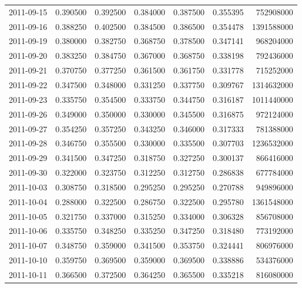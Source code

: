 \begin{tabular}{lrrrrrr}
2011-09-15 &    0.390500 &    0.392500 &    0.384000 &    0.387500 &    0.355395 &   752908000 \\
2011-09-16 &    0.388250 &    0.402500 &    0.384500 &    0.386500 &    0.354478 &  1391588000 \\
2011-09-19 &    0.380000 &    0.382750 &    0.368750 &    0.378500 &    0.347141 &   968204000 \\
2011-09-20 &    0.383250 &    0.384750 &    0.367000 &    0.368750 &    0.338198 &   792436000 \\
2011-09-21 &    0.370750 &    0.377250 &    0.361500 &    0.361750 &    0.331778 &   715252000 \\
2011-09-22 &    0.347500 &    0.348000 &    0.331250 &    0.337750 &    0.309767 &  1314632000 \\
2011-09-23 &    0.335750 &    0.354500 &    0.333750 &    0.344750 &    0.316187 &  1011440000 \\
2011-09-26 &    0.349000 &    0.350000 &    0.330000 &    0.345500 &    0.316875 &   972124000 \\
2011-09-27 &    0.354250 &    0.357250 &    0.343250 &    0.346000 &    0.317333 &   781388000 \\
2011-09-28 &    0.346750 &    0.355500 &    0.330000 &    0.335500 &    0.307703 &  1236532000 \\
2011-09-29 &    0.341500 &    0.347250 &    0.318750 &    0.327250 &    0.300137 &   866416000 \\
2011-09-30 &    0.322000 &    0.323750 &    0.312250 &    0.312750 &    0.286838 &   677784000 \\
2011-10-03 &    0.308750 &    0.318500 &    0.295250 &    0.295250 &    0.270788 &   949896000 \\
2011-10-04 &    0.288000 &    0.322500 &    0.286750 &    0.322500 &    0.295780 &  1361548000 \\
2011-10-05 &    0.321750 &    0.337000 &    0.315250 &    0.334000 &    0.306328 &   856708000 \\
2011-10-06 &    0.335750 &    0.348250 &    0.335250 &    0.347250 &    0.318480 &   773192000 \\
2011-10-07 &    0.348750 &    0.359000 &    0.341500 &    0.353750 &    0.324441 &   806976000 \\
2011-10-10 &    0.359750 &    0.369500 &    0.359000 &    0.369500 &    0.338886 &   534376000 \\
2011-10-11 &    0.366500 &    0.372500 &    0.364250 &    0.365500 &    0.335218 &   816080000 \\

\end{tabular}
